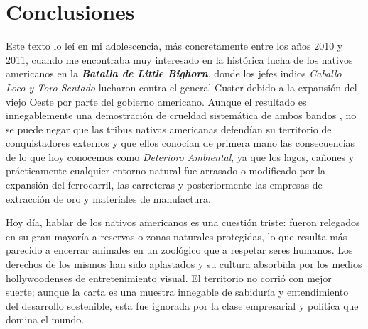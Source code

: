 
\section{Conclusiones}
\label{sec:conclusiones}

Este texto lo leí en mi adolescencia, más concretamente entre los años 2010 y 2011,
cuando me encontraba muy interesado en la histórica lucha de los nativos americanos en
la \textbf{\textit{Batalla de Little Bighorn}}, donde los jefes indios
\textit{Caballo Loco y Toro Sentado} lucharon contra el general Custer debido a la expansión
del viejo Oeste por parte del gobierno americano. Aunque el resultado es innegablemente una
demostración de crueldad sistemática de ambos bandos \cite{philbrick2010last},
no se puede negar que las tribus nativas americanas defendían su territorio de conquistadores
externos y que ellos conocían de primera mano las consecuencias de lo que hoy conocemos como
\textit{Deterioro Ambiental}, ya que los lagos, cañones y prácticamente cualquier entorno
natural fue arrasado o modificado por la expansión del ferrocarril, las carreteras y
posteriormente las empresas de extracción de oro y materiales de manufactura.

Hoy día, hablar de los nativos americanos es una cuestión triste: fueron relegados en su gran
mayoría a reservas o zonas naturales protegidas, lo que resulta más parecido a encerrar animales
en un zoológico que a respetar seres humanos. Los derechos de los mismos han sido aplastados
y su cultura absorbida por los medios hollywoodenses de entretenimiento visual. El territorio
no corrió con mejor suerte; aunque la carta es una muestra innegable de sabiduría y entendimiento
del desarrollo sostenible, esta fue ignorada por la clase empresarial y política que domina el mundo.
